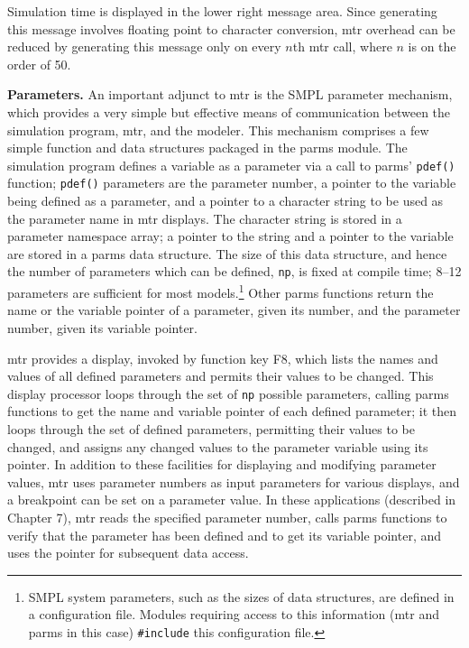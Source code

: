 Simulation time is displayed in the lower right message area. Since
generating this message involves floating point to character conversion, mtr
overhead can be reduced by generating this message only on every $n$th mtr
call, where $n$ is on the order of 50.

\textbf{Parameters.} An important adjunct to mtr is the SMPL parameter mechanism,
which provides a very simple but effective means of communication
between the simulation program, mtr, and the modeler. This mechanism
comprises a few simple function and data structures packaged in the parms
module. The simulation program defines a variable as a parameter via a
call to parms' \texttt{pdef()} function; \texttt{pdef()} parameters are the parameter
number, a pointer to the variable being defined as a parameter, and a pointer
to a character string to be used as the parameter name in mtr displays. The
character string is stored in a parameter namespace array; a pointer to the
string and a pointer to the variable are stored in a parms data structure. The
size of this data structure, and hence the number of parameters which can be
defined, \texttt{np}, is fixed at compile time; 8--12 parameters are sufficient for most
models.\footnote{SMPL system parameters, such as the sizes of data structures, are defined in a configuration file. Modules requiring access to this information (mtr and parms in this case) \texttt{\#include} this configuration file.}
Other parms functions return the name or the variable pointer of a
parameter, given its number, and the parameter number, given its variable
pointer.

mtr provides a display, invoked by function key F8, which lists the
names and values of all defined parameters and permits their values to be
changed. This display processor loops through the set of \texttt{np} possible
parameters, calling parms functions to get the name and variable pointer of
each defined parameter; it then loops through the set of defined parameters,
permitting their values to be changed, and assigns any changed
values to the parameter variable using its pointer. In addition to these
facilities for displaying and modifying parameter values, mtr uses
parameter numbers as input parameters for various displays, and a breakpoint
can be set on a parameter value. In these applications (described in
Chapter 7), mtr reads the specified parameter number, calls parms functions
to verify that the parameter has been defined and to get its variable
pointer, and uses the pointer for subsequent data access.

